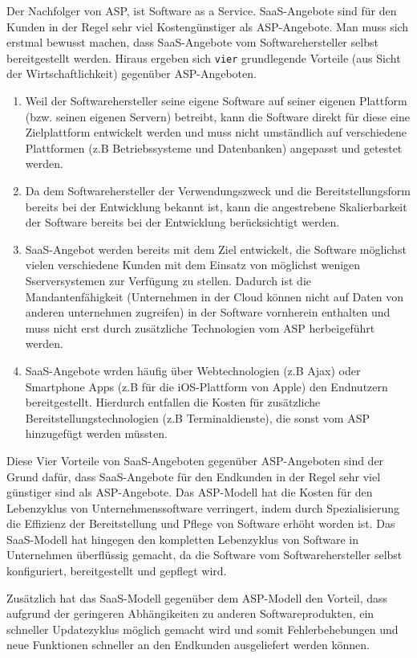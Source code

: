 \documentclass[a4paper,10pt]{article}
\begin{document}
\vspace{3mm}
Der Nachfolger von ASP, ist Software as a Service. SaaS-Angebote sind für den Kunden in der Regel sehr viel Kostengünstiger als ASP-Angebote. Man muss sich erstmal bewusst machen, dass SaaS-Angebote vom Softwarehersteller selbst bereitgestellt werden. Hiraus ergeben sich \texttt{vier} grundlegende Vorteile (aus Sicht der Wirtschaftlichkeit) gegenüber ASP-Angeboten.
\begin{enumerate}
	\item Weil der Softwarehersteller seine eigene Software auf seiner eigenen Plattform (bzw. seinen eigenen Servern) betreibt, kann die Software direkt für diese eine Zielplattform entwickelt werden und muss nicht umständlich auf verschiedene Plattformen (z.B Betriebssysteme und Datenbanken) angepasst und getestet werden.
	\item Da dem Softwarehersteller der Verwendungszweck und die Bereitstellungsform bereits bei der Entwicklung bekannt ist, kann die angestrebene Skalierbarkeit der Software bereits bei der Entwicklung berücksichtigt werden.
	\item SaaS-Angebot werden bereits mit dem Ziel entwickelt, die Software möglichst vielen verschiedene Kunden mit dem Einsatz von möglichst wenigen Sserversystemen zur Verfügung zu stellen. Dadurch ist die Mandantenfähigkeit (Unternehmen in der Cloud können nicht auf Daten von anderen unternehmen zugreifen) in der Software vornherein enthalten und muss nicht erst durch zusätzliche Technologien vom ASP herbeigeführt werden.
	\item SaaS-Angebote wrden häufig über Webtechnologien (z.B Ajax) oder Smartphone Apps (z.B für die iOS-Plattform von Apple) den Endnutzern bereitgestellt. Hierdurch entfallen die Kosten für zusätzliche Bereitstellungstechnologien (z.B Terminaldienste), die sonst vom ASP hinzugefügt werden müssten.
\end{enumerate}
Diese Vier Vorteile von SaaS-Angeboten gegenüber ASP-Angeboten sind der Grund dafür, dass SaaS-Angebote für den Endkunden in der Regel sehr viel günstiger sind als ASP-Angebote. Das ASP-Modell hat die Kosten für den Lebenzyklus von Unternehmenssoftware verringert, indem durch Spezialisierung die Effizienz der Bereitstellung und Pflege von Software erhöht worden ist. Das SaaS-Modell hat hingegen den kompletten Lebenzyklus von Software in Unternehmen überflüssig gemacht, da die Software vom Softwarehersteller selbst konfiguriert, bereitgestellt und gepflegt wird.


Zusätzlich hat das SaaS-Modell gegenüber dem ASP-Modell den Vorteil, dass aufgrund der geringeren Abhängikeiten zu anderen Softwareprodukten, ein schneller Updatezyklus möglich gemacht wird und somit Fehlerbehebungen und neue Funktionen schneller an den Endkunden ausgeliefert werden können.
\end{document}
